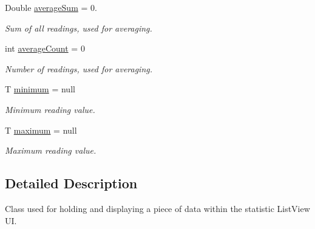 \begin{DoxyCompactItemize}
\mbox{\label{classcom_1_1jack_1_1motorbikestatistics_1_1_data_item_ab1d6f0c800def7c32486e31e8195349e}} 
Double \hyperlink{classcom_1_1jack_1_1motorbikestatistics_1_1_data_item_ab1d6f0c800def7c32486e31e8195349e}{average\+Sum} = 0.
\begin{DoxyCompactList}\small\item\em Sum of all readings, used for averaging. \end{DoxyCompactList}\item 
\mbox{\label{classcom_1_1jack_1_1motorbikestatistics_1_1_data_item_aaa50027610a16f6a373f0cd3f5a96333}} 
int \hyperlink{classcom_1_1jack_1_1motorbikestatistics_1_1_data_item_aaa50027610a16f6a373f0cd3f5a96333}{average\+Count} = 0
\begin{DoxyCompactList}\small\item\em Number of readings, used for averaging. \end{DoxyCompactList}\item 
\mbox{\label{classcom_1_1jack_1_1motorbikestatistics_1_1_data_item_a770342aaa7248e9687517864d73f0009}} 
T \hyperlink{classcom_1_1jack_1_1motorbikestatistics_1_1_data_item_a770342aaa7248e9687517864d73f0009}{minimum} = null
\begin{DoxyCompactList}\small\item\em Minimum reading value. \end{DoxyCompactList}\item 
\mbox{\label{classcom_1_1jack_1_1motorbikestatistics_1_1_data_item_ac1edb9c63224cebf789b7a2ffd45598f}} 
T \hyperlink{classcom_1_1jack_1_1motorbikestatistics_1_1_data_item_ac1edb9c63224cebf789b7a2ffd45598f}{maximum} = null
\begin{DoxyCompactList}\small\item\em Maximum reading value. \end{DoxyCompactList}\end{DoxyCompactItemize}


\subsection{Detailed Description}
Class used for holding and displaying a piece of data within the statistic List\+View UI. 

